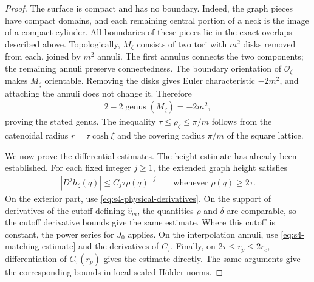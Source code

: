 \documentclass[a4paper,11pt,oneside,reqno]{amsart}
\numberwithin{equation}{section}
\theoremstyle{definition}
\begin{document}
\begin{proof}
    The surface is compact and has no boundary. Indeed,
    the graph pieces have compact domains, and each
    remaining central portion of a neck is the image of
    a compact cylinder. All boundaries of these pieces
    lie in the exact overlaps described above.
    Topologically, $M_\zeta$ consists of two tori with
    $m^2$ disks removed from each, joined by $m^2$
    annuli. The first annulus connects the two components;
    the remaining annuli preserve connectedness. The
    boundary orientation of $\mathcal O_\zeta$ makes
    $M_\zeta$ orientable. Removing the disks gives Euler
    characteristic $-2m^2$, and attaching the annuli
    does not change it. Therefore
    \begin{align*}
        2-2\operatorname{genus}(M_\zeta)=-2m^2,
    \end{align*}
    proving the stated genus. The inequality
    $\tau\leq\rho_\zeta\leq\pi/m$ follows from the
    catenoidal radius $r=\tau\cosh\xi$ and the covering
    radius $\pi/m$ of the square lattice.

    We now prove the differential estimates. The height
    estimate has already been established. For each fixed
    integer $j\geq1$, the extended graph height satisfies
    \begin{align*}
        |D^jh_\zeta(q)|
        \leq C_j\tau\rho(q)^{-j}
        \qquad\text{whenever }\rho(q)\geq2\tau.
    \end{align*}
    On the exterior part, use
    \eqref{eq:s4-physical-derivatives}. On the support of
    derivatives of the cutoff defining $\widehat v_m$,
    the quantities $\rho$ and $\delta$ are comparable,
    so the cutoff derivative bounds give the same estimate.
    Where this cutoff is constant, the power series for
    $J_0$ applies. On the interpolation annuli, use
    \eqref{eq:s4-matching-estimate} and the derivatives
    of $C_\tau$. Finally, on $2\tau\leq r_p\leq2r_c$,
    differentiation of $C_\tau(r_p)$ gives the estimate
    directly. The same arguments give the corresponding
    bounds in local scaled H\"older norms.


\end{proof}
\end{document}
